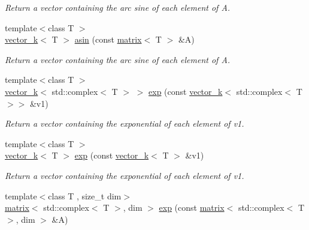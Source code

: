 \begin{DoxyCompactItemize}
\begin{DoxyCompactList}\small\item\em Return a vector containing the arc sine of each element of A. \end{DoxyCompactList}\item 
\hypertarget{namespacekeycpp_a25e9b69ef51cf53cc780fd5a99bcde1b}{{\footnotesize template$<$class T $>$ }\\\hyperlink{classkeycpp_1_1vector__k}{vector\-\_\-k}$<$ T $>$ \hyperlink{namespacekeycpp_a25e9b69ef51cf53cc780fd5a99bcde1b}{asin} (const \hyperlink{classkeycpp_1_1matrix}{matrix}$<$ T $>$ \&A)}\label{namespacekeycpp_a25e9b69ef51cf53cc780fd5a99bcde1b}

\begin{DoxyCompactList}\small\item\em Return a vector containing the arc sine of each element of A. \end{DoxyCompactList}\item 
\hypertarget{namespacekeycpp_abb06bdc0fc2627f8f5390e0b1da588c3}{{\footnotesize template$<$class T $>$ }\\\hyperlink{classkeycpp_1_1vector__k}{vector\-\_\-k}$<$ std\-::complex$<$ T $>$ $>$ \hyperlink{namespacekeycpp_abb06bdc0fc2627f8f5390e0b1da588c3}{exp} (const \hyperlink{classkeycpp_1_1vector__k}{vector\-\_\-k}$<$ std\-::complex$<$ T $>$$>$ \&v1)}\label{namespacekeycpp_abb06bdc0fc2627f8f5390e0b1da588c3}

\begin{DoxyCompactList}\small\item\em Return a vector containing the exponential of each element of v1. \end{DoxyCompactList}\item 
\hypertarget{namespacekeycpp_a22e3ee37c7d6c67e9951d9546082b8b8}{{\footnotesize template$<$class T $>$ }\\\hyperlink{classkeycpp_1_1vector__k}{vector\-\_\-k}$<$ T $>$ \hyperlink{namespacekeycpp_a22e3ee37c7d6c67e9951d9546082b8b8}{exp} (const \hyperlink{classkeycpp_1_1vector__k}{vector\-\_\-k}$<$ T $>$ \&v1)}\label{namespacekeycpp_a22e3ee37c7d6c67e9951d9546082b8b8}

\begin{DoxyCompactList}\small\item\em Return a vector containing the exponential of each element of v1. \end{DoxyCompactList}\item 
\hypertarget{namespacekeycpp_a0302faeef7172f537f3473216c0cf33b}{{\footnotesize template$<$class T , size\-\_\-t dim$>$ }\\\hyperlink{classkeycpp_1_1matrix}{matrix}$<$ std\-::complex$<$ T $>$, dim $>$ \hyperlink{namespacekeycpp_a0302faeef7172f537f3473216c0cf33b}{exp} (const \hyperlink{classkeycpp_1_1matrix}{matrix}$<$ std\-::complex$<$ T $>$, dim $>$ \&A)}\label{namespacekeycpp_a0302faeef7172f537f3473216c0cf33b}


\end{DoxyCompactItemize}
